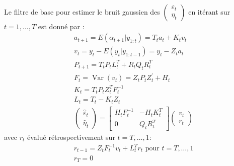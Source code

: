 \documentclass{article}
\theoremstyle{definition}
\theoremstyle{remark}
\begin{document}
{\paragraph{}
Le filtre de base pour estimer le bruit gaussien des
$\left(\begin{array}{c}{
    \varepsilon_t} \\ 
{\eta}_t\end{array}
\right)$
en itérant sur $t=1, \ldots, T$
est donné par \cite{kalman}  : 
\begin{equation}
	\begin{aligned}
        &a_{t+1} =E(\alpha_{t+1} | y_{1:t}) = T_{t} a_{t}+K_{t} v_{t}\\
        &v_{t} = y_{t}-E(y_{t} |y_{1: t-1}) = y_{t}-Z_{t} a_{t}  \\
        &P_{t+1} = T_{t} P_{t} L_{t}^{T}+R_{t} Q_{t} R_{t}^{T} \\
        &F_{t} = \operatorname{Var}\left(v_{t}\right)=Z_{t} P_{t} Z_{t}^{\prime}+H_{t} \\
	&K_{t} =T_{t} P_{t} Z_{t}^{T} F_{t}^{-1} \\
	&L_{t}=T_{t}-K_{t} Z_{t} \\
	&\left(
        \begin{array}{c}{
            \hat{\varepsilon}_t} \\ 
            {\hat{\eta}_t}
        \end{array}
        \right)
        = \left[
            \begin{array}{cc}{
                H_{t} F_{t}^{-1}} & {-H_{t} K_{t}^{T}} \\
                {0} & {Q_{t} R_{t}^{T}}
            \end{array}\right]
            \left(
                \begin{array}{c}{
                    v_{t}} \\
                    {r_{t}}
                \end{array}
                \right)
            \end{aligned}
        \end{equation}
        avec $r_t$ évalué rétrospectivement sur $t=T, \ldots, 1$:
        \begin{equation}
            \label{backward}
            \begin{aligned}
                &r_{t-1} =Z_{t} F_{t}^{-1} v_{t}+L_{t}^{T} r_{t}\text{  pour  } t=T, \ldots, 1 \\
                &r_T = 0
            \end{aligned}

\end{equation}}
\end{document}
